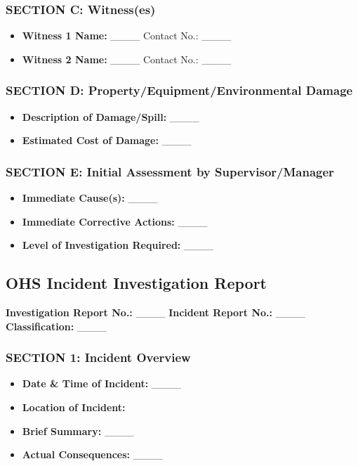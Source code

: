 \documentclass[11pt]{article}
\newcommand{\location}{}
\begin{document}
\subsubsection*{SECTION C: Witness(es)}
\begin{itemize}
    \item \textbf{Witness 1 Name:} \_\_\_\_ Contact No.: \_\_\_\_
    \item \textbf{Witness 2 Name:} \_\_\_\_ Contact No.: \_\_\_\_
\end{itemize}

\subsubsection*{SECTION D: Property/Equipment/Environmental Damage}
\begin{itemize}
    \item \textbf{Description of Damage/Spill:} \_\_\_\_
    \item \textbf{Estimated Cost of Damage:} \_\_\_\_
\end{itemize}

\subsubsection*{SECTION E: Initial Assessment by Supervisor/Manager}
\begin{itemize}
    \item \textbf{Immediate Cause(s):} \_\_\_\_
    \item \textbf{Immediate Corrective Actions:} \_\_\_\_
    \item \textbf{Level of Investigation Required:} \_\_\_\_
\end{itemize}

\subsection*{OHS Incident Investigation Report}

\textbf{Investigation Report No.:} \_\_\_\_ \textbf{Incident Report No.:} \_\_\_\_ \\
\textbf{Classification:} \_\_\_\_

\subsubsection*{SECTION 1: Incident Overview}
\begin{itemize}
    \item \textbf{Date \& Time of Incident:} \_\_\_\_
    \item \textbf{Location of Incident:} \location
    \item \textbf{Brief Summary:} \_\_\_\_
    \item \textbf{Actual Consequences:} \_\_\_\_
\end{itemize}
\end{document}
